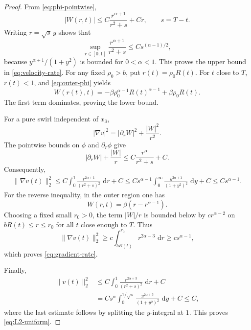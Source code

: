 \documentclass[10pt,a4paper]{amsart}
\newcommand{\dd}{\,\mathrm d}
\begin{document}
\begin{proof}
From \eqref{eq:phi-pointwise},
\[
    |W(r,t)|\leq C\frac{r^{\alpha+1}}{r^2+s}+Cr,
    \qquad s=T-t.
\]
Writing $r=\sqrt{s}\,y$ shows that
\[
    \sup_{r\in[0,1]}\frac{r^{\alpha+1}}{r^2+s}
    \leq Cs^{(\alpha-1)/2},
\]
because $y^{\alpha+1}/(1+y^2)$ is bounded for $0<\alpha<1$.  This proves the
upper bound in \eqref{eq:velocity-rate}.  For any fixed $\rho_0>b$, put
$r(t)=\rho_0R(t)$.  For $t$ close to $T$, $r(t)<1$, and
\eqref{eq:outer-phi} yields
\[
    W(r(t),t)
    =-\beta\rho_0^{\alpha-1}R(t)^{\alpha-1}
      +\beta\rho_0R(t).
\]
The first term dominates, proving the lower bound.

For a pure swirl independent of $x_3$,
\begin{equation}
\label{eq:grad-swirl}
    |\nabla v|^2=|\partial_rW|^2+\frac{|W|^2}{r^2}.
\end{equation}
The pointwise bounds on $\phi$ and $\partial_r\phi$ give
\[
    |\partial_rW|+\frac{|W|}{r}
    \leq C\frac{r^\alpha}{r^2+s}+C.
\]
Consequently,
\begin{align}
\|\nabla v(t)\|_2^2\leq C\int_0^1\frac{r^{2\alpha+1}}{(r^2+s)^2}\,\dd r+C\leq Cs^{\alpha-1}
      \int_0^\infty\frac{y^{2\alpha+1}}{(1+y^2)^2}\,\dd y+C
     \leq Cs^{\alpha-1}.
\end{align}
For the reverse inequality, in the outer region one has
\[
    W(r,t)=\beta(r-r^{\alpha-1}).
\]
Choosing a fixed small $r_0>0$, the term $|W|/r$ is bounded below by
$cr^{\alpha-2}$ on $bR(t)\leq r\leq r_0$ for all $t$ close enough to $T$.
Thus
\[
    \|\nabla v(t)\|_2^2
    \geq c\int_{bR(t)}^{r_0}r^{2\alpha-3}\,\dd r
    \geq cs^{\alpha-1},
\]
which proves \eqref{eq:gradient-rate}.

Finally,
\begin{align}
    \|v(t)\|_2^2
    &\leq C\int_0^1\frac{r^{2\alpha+3}}{(r^2+s)^2}\,\dd r+C\\
    &=Cs^\alpha\int_0^{1/\sqrt{s}}
       \frac{y^{2\alpha+3}}{(1+y^2)^2}\,\dd y+C
      \leq C,
\end{align}
where the last estimate follows by splitting the $y$-integral at $1$.
This proves \eqref{eq:L2-uniform}.
\end{proof}
\end{document}

